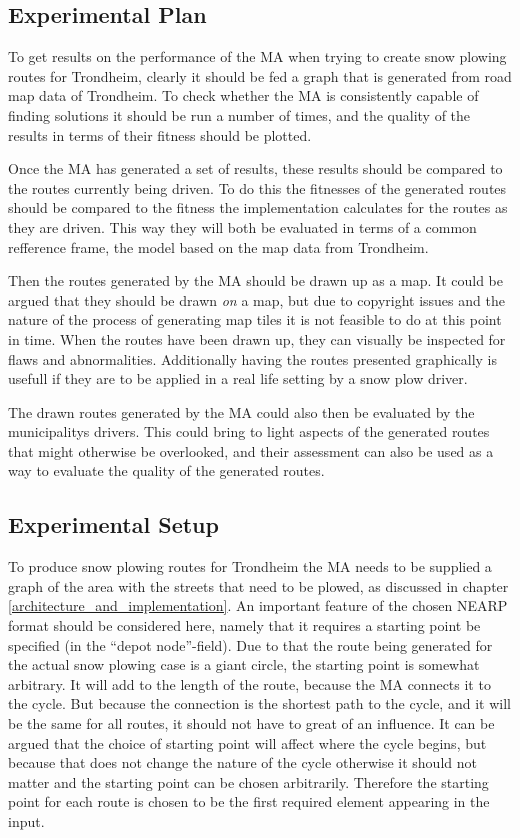 \subsection{Experimental Plan}

To get results on the performance of the MA when trying to create snow plowing routes for Trondheim, clearly it should be fed a graph that is generated from road map data of Trondheim. To check whether the MA is consistently capable of finding solutions it should be run a number of times, and the quality of the results in terms of their fitness should be plotted.

Once the MA has generated a set of results, these results should be compared to the routes currently being driven. To do this the fitnesses of the generated routes should be compared to the fitness the implementation calculates for the routes as they are driven. This way they will both be evaluated in terms of a common refference frame, the model based on the map data from Trondheim.

Then the routes generated by the MA should be drawn up as a map. It could be argued that they should be drawn \emph{on} a map, but due to copyright issues and the nature of the process of generating map tiles it is not feasible to do at this point in time. When the routes have been drawn up, they can visually be inspected for flaws and abnormalities. Additionally having the routes presented graphically is usefull if they are to be applied in a real life setting by a snow plow driver.

The drawn routes generated by the MA could also then be evaluated by the municipalitys drivers. This could bring to light aspects of the generated routes that might otherwise be overlooked, and their assessment can also be used as a way to evaluate the quality of the generated routes.

\subsection{Experimental Setup}

To produce snow plowing routes for Trondheim the MA needs to be supplied a graph of the area with the streets that need to be plowed, as discussed in chapter \ref{architecture_and_implementation}. An important feature of the chosen NEARP format should be considered here, namely that it requires a starting point be specified (in the \enquote{depot node}-field). Due to that the route being generated for the actual snow plowing case is a giant circle, the starting point is somewhat arbitrary. It will add to the length of the route, because the MA connects it to the cycle. But because the connection is the shortest path to the cycle, and it will be the same for all routes, it should not have to great of an influence. It can be argued that the choice of starting point will affect where the cycle begins, but because that does not change the nature of the cycle otherwise it should not matter and the starting point can be chosen arbitrarily. Therefore the starting point for each route is chosen to be the first required element appearing in the input.

